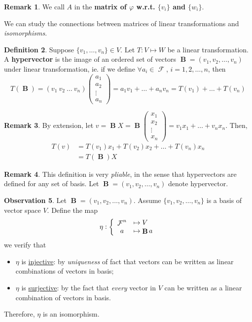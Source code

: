 \documentclass[11pt]{amsart} %
\theoremstyle{definition}
\newtheorem{definition}{Definition}[section]
\newtheorem{obs}[definition]{Observation}
\theoremstyle{definition}
\newtheorem{remark}[definition]{Remark}
\DeclareMathOperator{\FF}{\mathcal{F}}
\DeclareMathOperator{\hv}{\mathbf{B}}
\numberwithin{equation}{section}
\begin{document}
\begin{remark}
	We call $A$ in  the \textbf{matrix of $\varphi$ w.r.t. $\{v_i\}$ and $\{w_i\}$}.
\end{remark}

We can study the connections between matrices of linear transformations and \textit{isomorphisms}.

\begin{definition}
	Suppose $\{v_1,\dots,v_n\} \in V$. Let $T: V \mapsto W$ be a linear transformation. A \textbf{hypervector} is the image of an ordered set of vectors $\hv = (v_1, v_2, \dots, v_n)$ under linear transformation, ie. if we define $\forall a_i \in \FF$, $i =1,2,\dots,n$, then
	$$ T(\hv) = (v_1 \: v_2 \: \dots \: v_n ) \left( \begin{array}{c} a_1 \\ a_2 \\ \vdots \\ a_n \end{array} \right) = a_1 v_1 + \dots + a_n v_n = T(v_1) + \dots + T(v_n)$$
\end{definition}

\begin{remark}
	By extension, let $v = \hv X = \hv \left( \begin{array}{c} x_1 \\ x_2 \\ \vdots \\ x_n \end{array} \right) = v_1 x_1 + \dots + v_n x_n  $. Then,
	\begin{align*}
		T(v) &= T(v_1) x_1  + T(v_2 ) x_2 + \dots + T(v_n) x_n \\
		&= T(\hv) X
	\end{align*}
\end{remark}

\begin{remark}
	This definition is very \textit{pliable}, in the sense that hypervectors are defined for any set of basis. Let $\hv = (v_1,v_2,\dots,v_n)$ denote hypervector.
\end{remark}

\begin{obs}
	Let $\hv = (v_1, v_2, \dots, v_n)$. Assume $\{v_1,v_2,\dots,v_n \}$ is a basis of vector space $V$. Define the map
	$$ \eta : \left\{ \begin{array}{c l }
	\FF^n &\mapsto V \\
	a &\mapsto \hv a
	\end{array} \right. $$
	we verify that
	\begin{itemize}%
		\item $\eta$ is \uline{injective}: by \textit{uniqueness} of fact that vectors can be written as linear combinations of vectors in basis;
		\item $\eta$ is \uline{surjective}: by the fact that \textit{every} vector in $V$ can be written as a linear combination of vectors in basis.
	\end{itemize}
	Therefore, $\eta$ is an isomorphism.
\end{obs}
\end{document}
